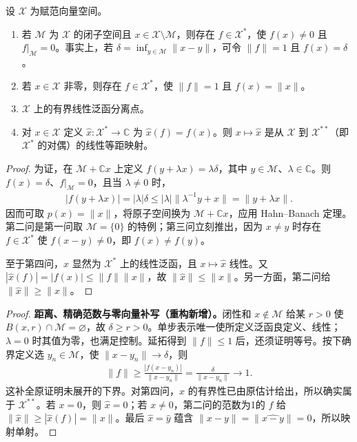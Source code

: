 \documentclass[../../main.tex]{subfiles}
\begin{document}
\begin{theorem}\label{theorem:ch05-dual-separation-embedding}
设 $\mathcal X$ 为赋范向量空间。
\begin{enumerate}
\item\label{item:ch05-dual-separates-subspace} 若 $\mathcal M$ 为 $\mathcal X$ 的闭子空间且 $x\in\mathcal X\setminus\mathcal M$，则存在 $f\in\mathcal X^*$，使 $f(x)\ne0$ 且 $f|_{\mathcal M}=0$。事实上，若 $\delta=\inf_{y\in\mathcal M}\|x-y\|$，可令 $\|f\|=1$ 且 $f(x)=\delta$。
\item\label{item:ch05-norming-functional} 若 $x\in\mathcal X$ 非零，则存在 $f\in\mathcal X^*$，使 $\|f\|=1$ 且 $f(x)=\|x\|$。
\item\label{item:ch05-dual-separates-points} $\mathcal X$ 上的有界线性泛函分离点。
\item\label{item:ch05-canonical-isometry} 对 $x\in\mathcal X$ 定义 $\widehat x:\mathcal X^*\to\mathbb C$ 为 $\widehat x(f)=f(x)$。则 $x\mapsto\widehat x$ 是从 $\mathcal X$ 到 $\mathcal X^{**}$（即 $\mathcal X^*$ 的对偶）的线性等距映射。
\end{enumerate}
\end{theorem}
\begin{proof}
为证，在 $\mathcal M+\mathbb Cx$ 上定义 $f(y+\lambda x)=\lambda\delta$，其中 $y\in\mathcal M$、$\lambda\in\mathbb C$。则 $f(x)=\delta$、$f|_{\mathcal M}=0$，且当 $\lambda\ne0$ 时，
\begin{align*}
|f(y+\lambda x)|=|\lambda|\delta\le|\lambda|\|\lambda^{-1}y+x\|=\|y+\lambda x\|.
\end{align*}
因而可取 $p(x)=\|x\|$，将原子空间换为 $\mathcal M+\mathbb Cx$，应用 Hahn--Banach 定理。第二问是第一问取 $\mathcal M=\{0\}$ 的特例；第三问立刻推出，因为 $x\ne y$ 时存在 $f\in\mathcal X^*$ 使 $f(x-y)\ne0$，即 $f(x)\ne f(y)$。

至于第四问，$\widehat x$ 显然为 $\mathcal X^*$ 上的线性泛函，且 $x\mapsto\widehat x$ 线性。又 $|\widehat x(f)|=|f(x)|\le\|f\|\|x\|$，故 $\|\widehat x\|\le\|x\|$。另一方面，第二问给 $\|\widehat x\|\ge\|x\|$。
\end{proof}
\begin{proof}
\textbf{距离、精确范数与零向量补写（重构新增）。}闭性和 $x\notin\mathcal M$ 给某 $r>0$ 使 $B(x,r)\cap\mathcal M=\varnothing$，故 $\delta\ge r>0$。单步表示唯一使所定义泛函良定义、线性；$\lambda=0$ 时其值为零，也满足控制。延拓得到 $\|f\|\le1$ 后，还须证明等号。按下确界定义选 $y_n\in\mathcal M$，使 $\|x-y_n\|\to\delta$，则
\begin{align*}
\|f\|\ge\frac{|f(x-y_n)|}{\|x-y_n\|}=\frac{\delta}{\|x-y_n\|}\longrightarrow1.
\end{align*}
这补全原证明未展开的下界。对第四问，$\widehat x$ 的有界性已由原估计给出，所以确实属于 $\mathcal X^{**}$。若 $x=0$，则 $\widehat x=0$；若 $x\ne0$，第二问的范数为1的 $f$ 给 $\|\widehat x\|\ge|\widehat x(f)|=\|x\|$。最后 $\widehat x=\widehat y$ 蕴含 $\|x-y\|=\|\widehat{x-y}\|=0$，所以映射单射。
\end{proof}
\end{document}
